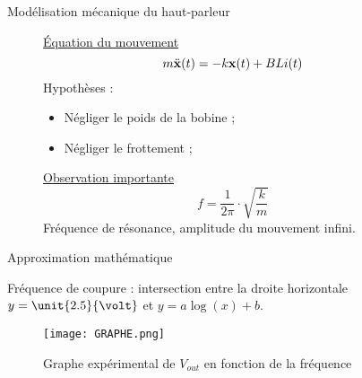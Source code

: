 \documentclass[pdf]{beamer}
\newcommand\fv[1]{{\bf #1}} %
\newcommand\fvdd[1]{\ddot{\bf #1}} %
\begin{document}
\begin{frame}{Modélisation mécanique du haut-parleur}
	\begin{figure}[ht]
			\underline{Équation du mouvement}
			$$m\fvdd{x}(t) = -k\fv{x}(t) + BLi(t)$$
			Hypothèses : 
				\begin{itemize}
					\item Négliger le poids de la bobine ;
					\item Négliger le frottement ;
				\end{itemize}
		\endminipage\hfill
			\underline{Observation importante}
			$$f = \frac{1}{2\pi} \cdot{\sqrt{\frac{k}{m}}}$$
			Fréquence de résonance, amplitude du mouvement infini.
		\endminipage\hfill
	\end{figure}
\end{frame}

\begin{frame}{Approximation mathématique}

	Fréquence de coupure : intersection entre la droite horizontale $y = 
	\unit{2.5}{\volt}$ et $y = a\log(x) + b$.

	\begin{figure}[ht!]
		\texttt{[image: GRAPHE.png]}
		\caption{Graphe expérimental de $V_{out}$ en fonction de la fréquence}
	\end{figure}
\end{frame}
\end{document}

